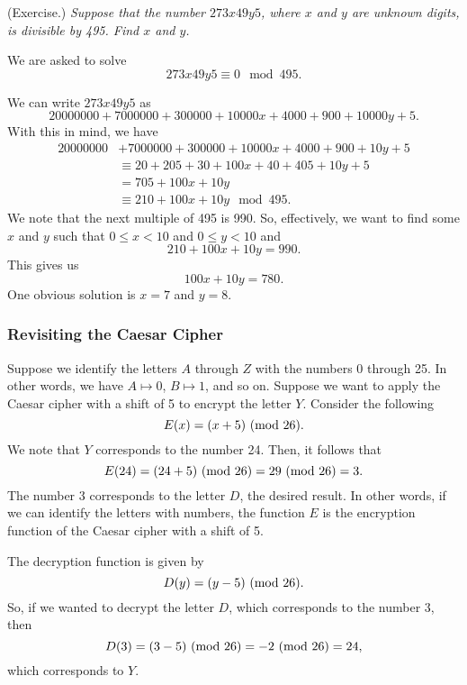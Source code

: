 \documentclass[letterpaper]{article}
\begin{document}
\begin{mdframed}[nobreak=true]
    (Exercise.) \emph{Suppose that the number $273x49y5$, where $x$ and $y$ are unknown digits, is divisible by 495. Find $x$ and $y$.}
    \begin{mdframed}
        We are asked to solve 
        \[273x49y5 \equiv 0 \mod{495}.\]

        We can write $273x49y5$ as 
        \[20000000 + 7000000 + 300000 + 10000x + 4000 + 900 + 10000y + 5.\]
        With this in mind, we have
        \begin{equation*}
            \begin{aligned}
                20000000 &+ 7000000 + 300000 + 10000x + 4000 + 900 + 10y + 5 \\ 
                    &\equiv 20 + 205 + 30 + 100x + 40 + 405 + 10y + 5 \\ 
                    &= 705 + 100x + 10y \\ 
                    &\equiv 210 + 100x + 10y \mod{495}.
            \end{aligned}
        \end{equation*}
        We note that the next multiple of 495 is 990. So, effectively, we want to find some $x$ and $y$ such that $0 \leq x < 10$ and $0 \leq y < 10$ and
        \[210 + 100x + 10y = 990.\]
        This gives us 
        \[100x + 10y = 780.\]
        One obvious solution is $x = 7$ and $y = 8$. 
    \end{mdframed}
\end{mdframed}


\subsubsection{Revisiting the Caesar Cipher}
Suppose we identify the letters $A$ through $Z$ with the numbers 0 through 25. In other words, we have $A \mapsto 0$, $B \mapsto 1$, and so on. Suppose we want to apply the Caesar cipher with a shift of 5 to encrypt the letter $Y$. Consider the following 
\[E(x) = (x + 5) \ (\mathrm{mod}\ 26).\]
We note that $Y$ corresponds to the number 24. Then, it follows that 
\[E(24) = (24 + 5) \ (\mathrm{mod}\ 26) = 29 \ (\mathrm{mod}\ 26) = 3.\]
The number 3 corresponds to the letter $D$, the desired result. In other words, if we can identify the letters with numbers, the function $E$ is the encryption function of the Caesar cipher with a shift of 5.  

\bigskip 

The decryption function is given by 
\[D(y) = (y - 5) \ (\mathrm{mod}\ 26).\]
So, if we wanted to decrypt the letter $D$, which corresponds to the number 3, then 
\[D(3) = (3 - 5) \ (\mathrm{mod}\ 26) = -2 \ (\mathrm{mod}\ 26) = 24,\]
which corresponds to $Y$. 
\end{document}
